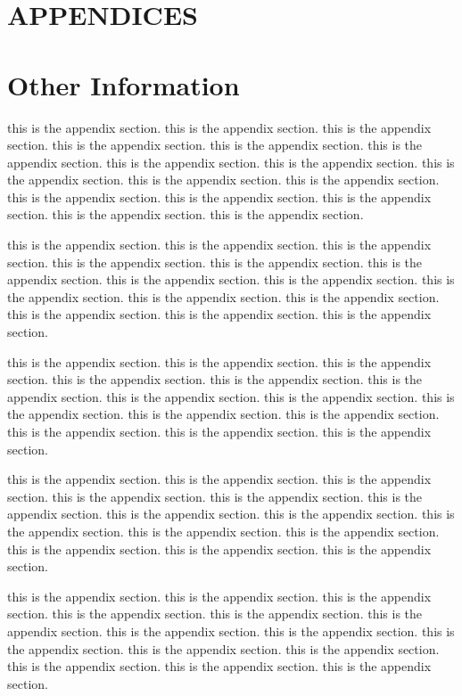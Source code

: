 \chapter*{APPENDICES}

\chapter{Other Information}

this is the appendix section. this is the appendix section. this is the appendix section. this is the appendix section. this is the appendix section. this is the appendix section. this is the appendix section. this is the appendix section. this is the appendix section. this is the appendix section. this is the appendix section. this is the appendix section. this is the appendix section. this is the appendix section. this is the appendix section. this is the appendix section.

this is the appendix section. this is the appendix section. this is the appendix section. this is the appendix section. this is the appendix section. this is the appendix section. this is the appendix section. this is the appendix section. this is the appendix section. this is the appendix section. this is the appendix section. this is the appendix section. this is the appendix section. this is the appendix section.

this is the appendix section. this is the appendix section. this is the appendix section. this is the appendix section. this is the appendix section. this is the appendix section. this is the appendix section. this is the appendix section. this is the appendix section. this is the appendix section. this is the appendix section. this is the appendix section. this is the appendix section. this is the appendix section.

this is the appendix section. this is the appendix section. this is the appendix section. this is the appendix section. this is the appendix section. this is the appendix section. this is the appendix section. this is the appendix section. this is the appendix section. this is the appendix section. this is the appendix section. this is the appendix section. this is the appendix section. this is the appendix section.

this is the appendix section. this is the appendix section. this is the appendix section. this is the appendix section. this is the appendix section. this is the appendix section. this is the appendix section. this is the appendix section. this is the appendix section. this is the appendix section. this is the appendix section. this is the appendix section. this is the appendix section. this is the appendix section.

